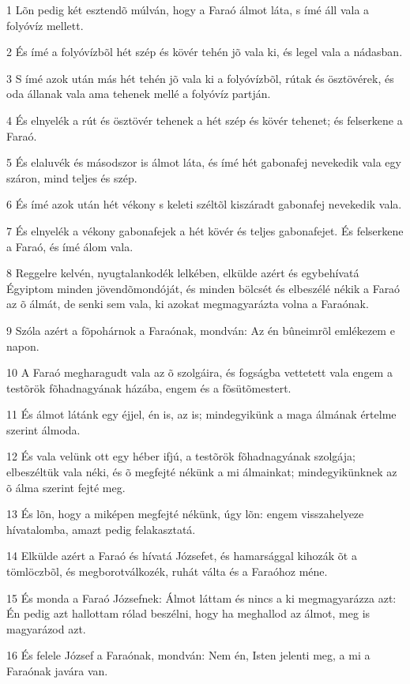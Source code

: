 \par 1 Lõn pedig két esztendõ múlván, hogy a Faraó álmot láta, s ímé áll vala a folyóvíz mellett.
\par 2 És ímé a folyóvízbõl hét szép és kövér tehén jõ vala ki, és legel vala a nádasban.
\par 3 S ímé azok után más hét tehén jõ vala ki a folyóvízbõl, rútak és ösztövérek, és oda állanak vala ama tehenek mellé a folyóvíz partján.
\par 4 És elnyelék a rút és ösztövér tehenek a hét szép és kövér tehenet; és felserkene a Faraó.
\par 5 És elaluvék és másodszor is álmot láta, és ímé hét gabonafej nevekedik vala egy száron, mind teljes és szép.
\par 6 És ímé azok után hét vékony s keleti széltõl kiszáradt gabonafej nevekedik vala.
\par 7 És elnyelék a vékony gabonafejek a hét kövér és teljes gabonafejet. És felserkene a Faraó, és ímé álom vala.
\par 8 Reggelre kelvén, nyugtalankodék lelkében, elkülde azért és egybehívatá Égyiptom minden jövendõmondóját, és minden bölcsét és elbeszélé nékik a Faraó az õ álmát, de senki sem vala, ki azokat megmagyarázta volna a Faraónak.
\par 9 Szóla azért a fõpohárnok a Faraónak, mondván: Az én bûneimrõl emlékezem e napon.
\par 10 A Faraó megharagudt vala az õ szolgáira, és fogságba vettetett vala engem a testõrök fõhadnagyának házába, engem és a fõsütõmestert.
\par 11 És álmot látánk egy éjjel, én is, az is; mindegyikünk a maga álmának értelme szerint álmoda.
\par 12 És vala velünk ott egy héber ifjú, a testõrök fõhadnagyának szolgája; elbeszéltük vala néki, és õ megfejté nékünk a mi álmainkat; mindegyikünknek az õ álma szerint fejté meg.
\par 13 És lõn, hogy a miképen megfejté nékünk, úgy lõn: engem visszahelyeze hívatalomba, amazt pedig felakasztatá.
\par 14 Elkülde azért a Faraó és hívatá Józsefet, és hamarsággal kihozák õt a tömlöczbõl, és megborotválkozék, ruhát válta és a Faraóhoz méne.
\par 15 És monda a Faraó Józsefnek: Álmot láttam és nincs a ki megmagyarázza azt: Én pedig azt hallottam rólad beszélni, hogy ha meghallod az álmot, meg is magyarázod azt.
\par 16 És felele József a Faraónak, mondván: Nem én, Isten jelenti meg, a mi a Faraónak javára van.
